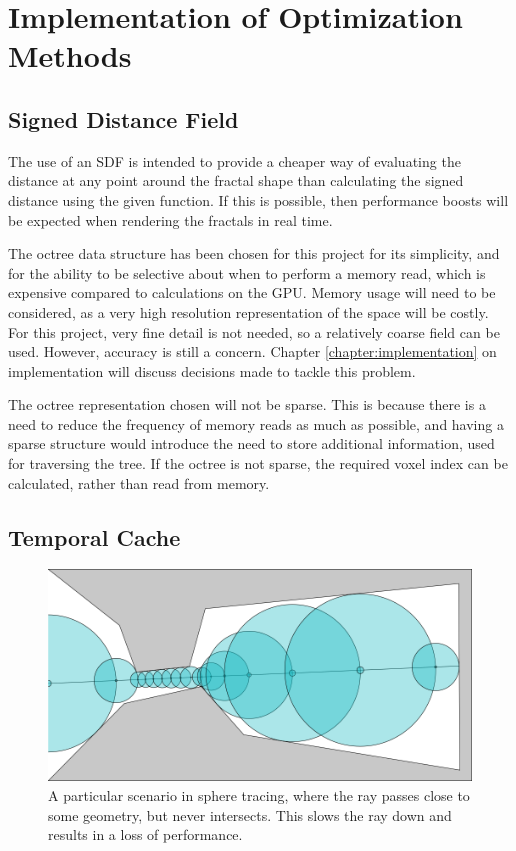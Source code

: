 \section{Implementation of Optimization Methods}

\subsection{Signed Distance Field}

The use of an SDF is intended to provide a cheaper way of evaluating the distance at any point around the fractal shape than calculating the signed distance using the given function. If this is possible, then performance boosts will be expected when rendering the fractals in real time.\newline

The octree data structure has been chosen for this project for its simplicity, and for the ability to be selective about when to perform a memory read, which is expensive compared to calculations on the GPU. Memory usage will need to be considered, as a very high resolution representation of the space will be costly. For this project, very fine detail is not needed, so a relatively coarse field can be used. However, accuracy is still a concern. Chapter \ref{chapter:implementation} on implementation will discuss decisions made to tackle this problem.\newline

The octree representation chosen will not be sparse. This is because there is a need to reduce the frequency of memory reads as much as possible, and having a sparse structure would introduce the need to store additional information, used for traversing the tree. If the octree is not sparse, the required voxel index can be calculated, rather than read from memory.

\subsection{Temporal Cache}

\begin{figure} [ht]
	\centering
	\includegraphics[width=0.65\linewidth, frame]{Images/Sphere-Tracing-Bottleneck.png}
	\caption{A particular scenario in sphere tracing, where the ray passes close to some geometry, but never intersects. This slows the ray down and results in a loss of performance.}
	\label{figure:sphere-tracing-bottleneck}
\end{figure}

